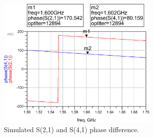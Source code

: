 \begin{figure}[h t b p]
	\centering
	\includegraphics[width=0.7\textwidth,keepaspectratio]{figures/41_21_phase.eps}
	\caption{Simulated S(2,1) and S(4,1) phase difference.}
	\label{fig:41_21_phase}
\end{figure}